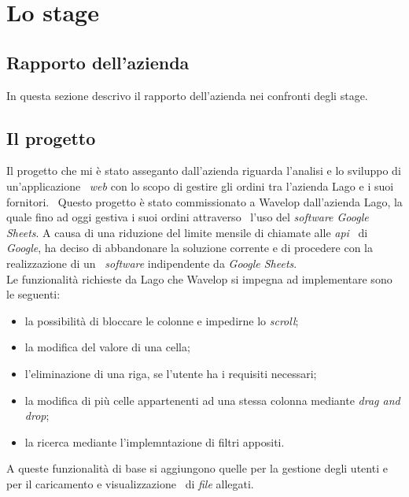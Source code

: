 
\chapter{Lo stage}
\label{cap:stage}
\section{Rapporto dell'azienda}
In questa sezione descrivo il rapporto dell'azienda nei confronti degli stage.

\section{Il progetto}
Il progetto che mi è stato asseganto dall'azienda riguarda l'analisi e lo sviluppo di un'applicazione \
\emph{web} con lo scopo di gestire gli ordini tra l'azienda Lago e i suoi fornitori. \ 
Questo progetto è stato commissionato a Wavelop dall'azienda Lago, la quale fino ad oggi gestiva i suoi ordini attraverso \
l'uso del \emph{software Google Sheets}. A causa di una riduzione del limite mensile di chiamate alle \emph{\acrshort{api}} \
di \emph{Google}, ha deciso di abbandonare la soluzione corrente e di procedere con la realizzazione di un \
\emph{software} indipendente da \emph{Google Sheets}. \\

Le funzionalità richieste da Lago che Wavelop si impegna ad implementare sono le seguenti: \
\begin{itemize}
  \item la possibilità di bloccare le colonne e impedirne lo \emph{scroll};
  \item la modifica del valore di una cella;
  \item l'eliminazione di una riga, se l'utente ha i requisiti necessari;
  \item la modifica di più celle appartenenti ad una stessa colonna mediante \emph{drag and drop};
  \item la ricerca mediante l'implemntazione di filtri appositi.
\end{itemize}
A queste funzionalità di base si aggiungono quelle per la gestione degli utenti e per il caricamento e visualizzazione \
di \emph{file} allegati. 

